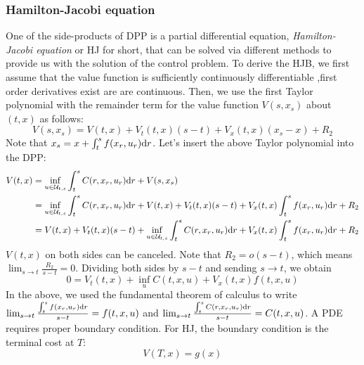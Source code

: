 \documentclass[11pt]{book}
\newcommand{\dr}{\text{\normalfont d}r}
\begin{document}
\subsubsection{Hamilton-Jacobi equation}
One of the side-products of DPP is a partial differential equation, \emph{Hamilton-Jacobi equation} or HJ for short, that can be solved via different methods to provide us with the solution of the control problem. 
To derive the HJB, we first assume that the value function is sufficiently continuously differentiable ,first order derivatives exist are are continuous. Then, we use the first Taylor polynomial with the remainder term for the value function $V(s,x_s)$ about $(t,x)$ as follows:
\[
V(s,x_s) = V(t,x) + V_t(t,x)(s-t) + V_x(t,x)(x_s-x) + R_2
\]
Note that $x_s=x+\int_t^s f(x_r,u_r){{\dr}}$. Let's insert the above Taylor polynomial into the DPP:
\[
\begin{split}
    V(t,x) & =\inf_{u\in\mathcal{U}_{t,s}}\int_t^sC(r,x_r,u_r){{\dr}}+V(s,x_s)\\
    & = \inf_{u\in\mathcal{U}_{t,s}}\int_t^sC(r,x_r,u_r){{\dr}}+V(t,x) + V_t(t,x)(s-t) + V_x(t,x)\int_t^s f(x_r,u_r){{\dr}} + R_2\\
    &= V(t,x) + V_t(t,x)(s-t) +\inf_{u\in\mathcal{U}_{t,s}}\int_t^sC(r,x_r,u_r){{\dr}} + V_x(t,x)\int_t^s f(x_r,u_r){{\dr}} + R_2\\
\end{split}
\]
$V(t,x)$ on both sides can be canceled. Note that $R_2=o(s-t)$, which means $\lim_{s\to t} \frac{R_2}{s-t}=0$.
Dividing both sides by $s-t$ and sending $s\to t$, we obtain
\begin{equation}\label{eqn:HJB_deterministic}
        0 = V_t(t,x) +\inf_{u} C(t,x,u) + V_x(t,x)f(t,x,u)
\end{equation}
In the above, we used the fundamental theorem of calculus to write $\lim_{s\to t} \frac{\int_t^s f(x_r,u_r){{\dr}}}{s-t}=f(t,x,u)$ and $\lim_{s\to t} \frac{\int_t^sC(r,x_r,u_r){{\dr}}}{s-t}=C(t,x,u)$.
A PDE requires proper boundary condition. For HJ, the boundary condition is the terminal cost at $T$:
\begin{equation}
    \label{eqn:HJ_terminal}
    V(T,x)=g(x)
\end{equation}
\end{document}

